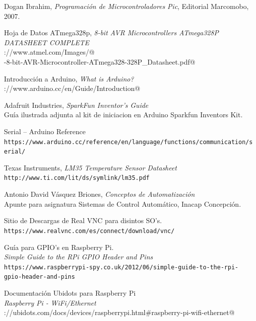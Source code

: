 \documentclass[letterpaper, 10pt]{report}
\begin{document}
 
\begin{thebibliography}{9}

  		 Dogan Ibrahim, 
  		\textit{Programación de Microcontroladores Pic},
  		Editorial Marcomobo,
  		2007.
  		
  		Hoja de Datos ATmega328p, \textit{8-bit AVR Microcontrollers ATmega328P
 		DATASHEET COMPLETE}\\
 		\verb@http://www.atmel.com/Images/@ \\
 		-8-bit-AVR-Microcontroller-ATmega328-328P_Datasheet.pdf@
 		
 		Introducción a Arduino, \textit{What is Arduino?}\\
 		\verb@https://www.arduino.cc/en/Guide/Introduction@
 		
 	Adafruit Industries, \textit{SparkFun Inventor’s Guide}\\
 	Guía ilustrada adjunta al kit de iniciacion en Arduino Sparkfun Inventors Kit.
 
 	Serial -- Arduino Reference\\
 	\texttt{https://www.arduino.cc/reference/en/language/functions/communication/serial/}
 	
 	Texas Instruments, {\it LM35 Temperature Sensor Datasheet}\\
 	\texttt{http://www.ti.com/lit/ds/symlink/lm35.pdf}
 	
 	Antonio David Vásquez Briones, \emph{Conceptos de Automatización}\\
 	Apunte para asignatura Sistemas de Control Automático, Inacap Concepción.
 	
 	Sitio de Descargas de Real VNC para disintos SO's.\\
 	\texttt{https://www.realvnc.com/es/connect/download/vnc/}
 	
 	Guía para GPIO's en Raspberry Pi. \\
 	\emph{Simple Guide to the RPi GPIO Header and Pins}\\
 	\texttt{https://www.raspberrypi-spy.co.uk/2012/06/simple-guide-to-the-rpi-gpio-header-and-pins}
 	
 	Documentación Ubidots para Raspberry Pi\\
 	\emph{Raspberry Pi - WiFi/Ethernet}\\
 	\verb@https://ubidots.com/docs/devices/raspberrypi.html#raspberry-pi-wifi-ethernet@

\end{thebibliography}
\newpage
\end{document}

